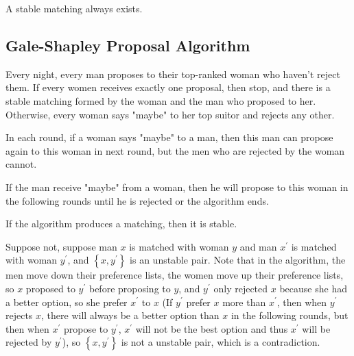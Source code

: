 \begin{theorem}
    A stable matching always exists.
\end{theorem}

\subsection{Gale-Shapley Proposal Algorithm}
Every night, every man proposes to their top-ranked woman who haven't reject them. If every women receives exactly one proposal, then stop, and there is a stable matching formed by the woman and the man who proposed to her. Otherwise, every woman says "maybe" to her top suitor and rejects any other. 

\begin{remark}
    In each round, if a woman says "maybe" to a man, then this man can propose again to this woman in next round, but the men who are rejected by the woman cannot.
\end{remark}

\begin{remark}
    If the man receive "maybe" from a woman, then he will propose to this woman in the following rounds until he is rejected or the algorithm ends.
\end{remark}

\begin{claim}
    If the algorithm produces a matching, then it is stable. 
\end{claim}
\begin{explanation}
    Suppose not, suppose man \(x\) is matched with woman \(y\) and man \(x^{\prime} \) is matched with woman \(y^{\prime} \), and \(\left\{ x, y^{\prime} \right\} \) is an unstable pair. Note that in the algorithm, the men move down their preference lists, the women move up their preference lists, so \(x\) proposed to \(y^{\prime} \) before proposing to \(y\), and \(y^{\prime} \) only rejected \(x\) because she had a better option, so she prefer \(x^{\prime} \) to \(x\) (If \(y^{\prime} \) prefer \(x\) more than \(x^{\prime}\), then when \(y^{\prime}\) rejects \(x\), there will always be a better option than \(x\) in the following rounds, but then when \(x^{\prime}\) propose to \(y^{\prime}\), \(x^{\prime}\) will not be the best option and thus \(x^{\prime} \) will be rejected by \(y^{\prime}\)), so \(\left\{ x, y^{\prime}  \right\} \) is not a unstable pair, which is a contradiction.             
\end{explanation}


